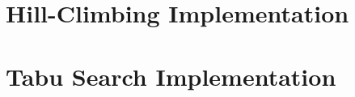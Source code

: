 \documentclass{article}
\begin{document}
\appendix

\section{Hill-Climbing Implementation}



\section{Tabu Search Implementation}


\end{document}
